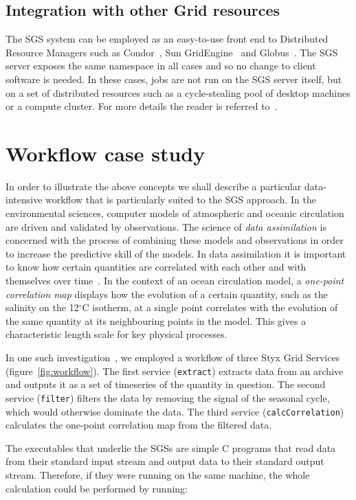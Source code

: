 \documentclass[a4paper]{article}
\begin{document}
\subsection{Integration with other Grid resources}
The SGS system can be employed as an easy-to-use front end to Distributed Resource Managers such as Condor~\cite{condor}, Sun GridEngine~\cite{sungridengine} and Globus~\cite{globustoolkit}.  The SGS server exposes the same namespace in all cases and so no change to client software is needed.  In these cases, jobs are not run on the SGS server itself, but on a set of distributed resources such as a cycle-stealing pool of desktop machines or a compute cluster.  For more details the reader is referred to~\cite{blower_escience:2006}.

\section{Workflow case study}\label{sec:casestudy}
In order to illustrate the above concepts we shall describe a particular data-intensive workflow that is particularly suited to the SGS approach.  In the environmental sciences, computer models of atmospheric and oceanic circulation are driven and validated by observations.  The science of \textit{data assimilation} is concerned with the process of combining these models and observations in order to increase the predictive skill of the models.  In data assimilation it is important to know how certain quantities are correlated with each other and with themselves over time~\cite{haines:2006}.  In the context of an ocean circulation model, a \textit{one-point correlation map} displays how the evolution of a certain quantity, such as the salinity on the 12$^\circ$C isotherm, at a single point correlates with the evolution of the same quantity at its neighbouring points in the model.  This gives a characteristic length scale for key physical processes.

In one such investigation~\cite{haines:2006}, we employed a workflow of three Styx Grid Services (figure~\ref{fig:workflow}).  The first service (\texttt{extract}) extracts data from an archive and outputs it as a set of timeseries of the quantity in question.  The second service (\texttt{filter}) filters the data by removing the signal of the seasonal cycle, which would otherwise dominate the data.  The third service (\texttt{calcCorrelation}) calculates the one-point correlation map from the filtered data.

The executables that underlie the SGSs are simple C programs that read data from their standard input stream and output data to their standard output stream.  Therefore, if they were running on the same machine, the whole calculation could be performed by running:
\end{document}
